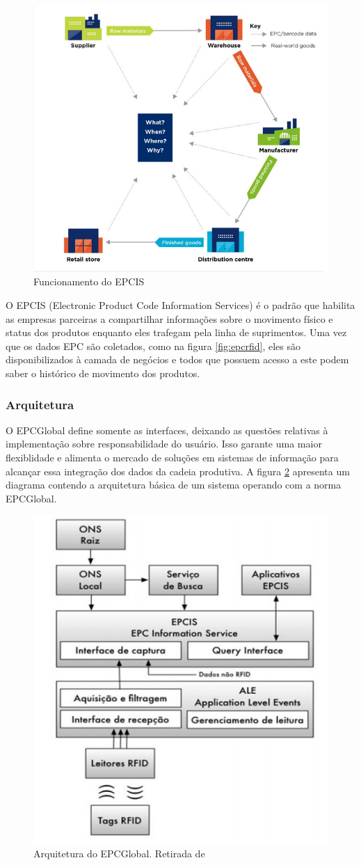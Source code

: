 	
	\begin{figure}[h!]
		\centering
		\includegraphics[width=0.5\linewidth]{epcis}
		\caption{Funcionamento do EPCIS}
		\label{fig:epcis}
	\end{figure}
	
	O EPCIS (Electronic Product Code Information Services) é o padrão que habilita as empresas parceiras a compartilhar informações sobre o movimento físico e status dos produtos enquanto eles trafegam pela linha de suprimentos. Uma vez que os dados EPC são coletados, como na figura \ref{fig:epcrfid}, eles são disponibilizados à camada de negócios e todos que possuem acesso a este podem saber o histórico de movimento dos produtos. 
	
	\subsubsection{Arquitetura}

	O EPCGlobal define somente as interfaces, deixando as questões relativas à implementação sobre responsabilidade do usuário. Isso garante uma maior flexiblidade e alimenta o mercado de soluções em sistemas de informação para alcançar essa integração dos dados da cadeia produtiva. A figura \ref{fig:epcarc} apresenta um diagrama contendo a arquitetura básica de um sistema operando com a norma EPCGlobal.

	\begin{figure}[h!]
		\centering
		\includegraphics[width=0.5\linewidth]{epcarc}
		\caption{Arquitetura do EPCGlobal. Retirada de \cite{epcSobCug} }
		\label{fig:epcarc}
	\end{figure}
	
